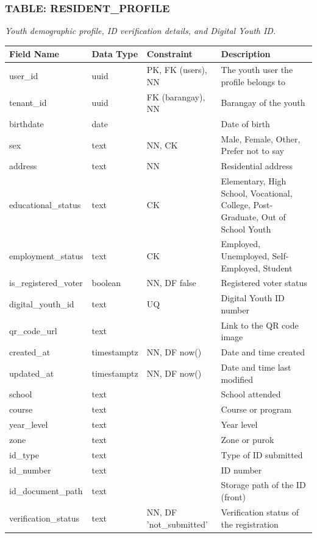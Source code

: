 \subsubsection*{TABLE: RESIDENT\_PROFILE}
\noindent\textit{Youth demographic profile, ID verification details, and Digital Youth ID.}
\begin{longtable}{|p{3.2cm}|p{2.2cm}|p{3.2cm}|p{5.4cm}|}
\hline
\textbf{Field Name} & \textbf{Data Type} & \textbf{Constraint} & \textbf{Description} \\ \hline
\endhead
\hline \endfoot
\hline \endlastfoot
user\_id & uuid & PK, FK (users), NN & The youth user the profile belongs to \\ \hline
tenant\_id & uuid & FK (barangay), NN & Barangay of the youth \\ \hline
birthdate & date & & Date of birth \\ \hline
sex & text & NN, CK & Male, Female, Other, Prefer not to say \\ \hline
address & text & NN & Residential address \\ \hline
educational\_status & text & CK & Elementary, High School, Vocational, College, Post-Graduate, Out of School Youth \\ \hline
employment\_status & text & CK & Employed, Unemployed, Self-Employed, Student \\ \hline
is\_registered\_voter & boolean & NN, DF false & Registered voter status \\ \hline
digital\_youth\_id & text & UQ & Digital Youth ID number \\ \hline
qr\_code\_url & text & & Link to the QR code image \\ \hline
created\_at & timestamptz & NN, DF now() & Date and time created \\ \hline
updated\_at & timestamptz & NN, DF now() & Date and time last modified \\ \hline
school & text & & School attended \\ \hline
course & text & & Course or program \\ \hline
year\_level & text & & Year level \\ \hline
zone & text & & Zone or purok \\ \hline
id\_type & text & & Type of ID submitted \\ \hline
id\_number & text & & ID number \\ \hline
id\_document\_path & text & & Storage path of the ID (front) \\ \hline
verification\_status & text & NN, DF 'not\_submitted' & Verification status of the registration \\ \hline

\end{longtable}
